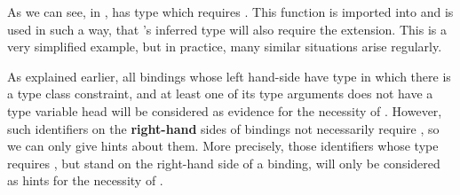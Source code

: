 \documentclass[main.tex]{subfiles}
\begin{document}
	As we can see, in ,  has type which requires . This function is imported into  and is used in such a way, that 's inferred type will also require the extension. This is a very simplified example, but in practice, many similar situations arise regularly.
	
	As explained earlier, all bindings whose left hand-side have type in which there is a type class constraint, and at least one of its type arguments does not have a type variable head will be considered as evidence for the necessity of . However, such identifiers on the \textbf{right-hand} sides of bindings not necessarily require , so we can only give hints about them. More precisely, those identifiers whose type requires , but stand on the right-hand side of a binding, will only be considered as hints for the necessity of .
		
\end{document}
